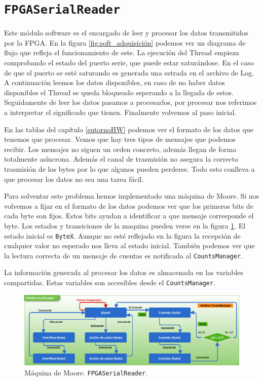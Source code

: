 \section{\texttt{FPGASerialReader}}
	Este módulo software es el encargado de leer y procesar los datos transmitidos por la FPGA. En la figura \ref{fig:soft_adquisición} podemos
	ver un diagrama de flujo que refleja el funcionamiento de este. La ejecución del Thread empieza comprobando el estado del puerto serie, que
	puede estar saturándose. En el caso de que el puerto se esté saturando es generada una estrada en el archivo de Log. A continuación leemos los
	datos disponibles, en caso de no haber datos disponibles el Thread se queda bloqueado esperando a la llegada de estos. Seguidamente de leer
	los datos pasamos a procesarlos, por procesar nos referimos a interpretar el significado que tienen. Finalmente volvemos al paso inicial.  
	\par
	En las tablas del capítulo \ref{entornoHW} podemos ver el formato de los datos que tenemos que procesar. Vemos que hay tres tipos de mensajes
	que podemos recibir. Los mensajes no siguen un orden concreto, además llegan de forma totalmente asíncrona. Además el canal de trasmisión no
	asegura la correcta trasmisión de los bytes por lo que algunos pueden perderse. Todo esto conlleva a que procesar los datos no sea una tarea
	fácil.
	\par
	Para solventar este problema hemos implementado una máquina de Moore. Si nos volvemos a fijar en el formato de los datos podemos ver que los
	primeros bits de cada byte son fijos. Estos bits ayudan a identificar a que mensaje corresponde el byte. Los estados y transiciones de la
	maquina pueden verse en la figura \ref{fig:reader}. El estado inicial es \texttt{ByteX}. Aunque no esté reflejado en la figura la recepción de
	cualquier valor no esperado nos lleva al estado inicial. También podemos ver que la lectura correcta de un mensaje de cuentas es notificada al
	\texttt{CountsManager}. 
	\par
	La información generada al procesar los datos es almacenada en las variables compartidas. Estas variables son accesibles desde el
	\texttt{CountsManager}.
	\begin{figure}[h]
		\centering
		\includegraphics[keepaspectratio, width=1\textwidth]{./img/reader.png}
		\caption{Máquina de Moore. \texttt{FPGASerialReader}.}   
		\label{fig:reader}
	\end{figure}

